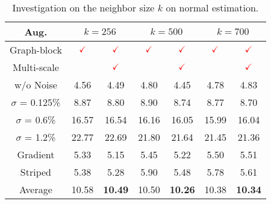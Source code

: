 \documentclass[runningheads]{llncs}
\begin{document}
\begin{table}[!htbp]
\caption{Investigation on the neighbor size $k$ on normal estimation.}
\begin{center}
\begin{tabular}{@{}ccccccc@{}}
\toprule
\textbf{Aug.}        & \multicolumn{2}{c}{$k=256$}                           & \multicolumn{2}{c}{$k=500$}                           & \multicolumn{2}{c}{$k=700$}                           \\ \midrule
Graph-block & $\color{red}\checkmark$ & $\color{red}\checkmark$ & $\color{red}\checkmark$ & $\color{red}\checkmark$ & $\color{red}\checkmark$ & $\color{red}\checkmark$ \\
Multi-scale &                         & $\color{red}\checkmark$ &                         & $\color{red}\checkmark$ &                         & $\color{red}\checkmark$ \\
w/o Noise    & 4.56                    & 4.49                    & 4.80                    & 4.45                    & 4.78                    & 4.83                    \\
$\sigma$ = 0.125\%   & 8.87                    & 8.80                    & 8.90                    & 8.74                   & 8.77                    & 8.70                    \\
$\sigma$ = 0.6\%   & 16.57                   & 16.54                   & 16.16                   & 16.05                   & 15.99                   & 16.04                   \\
$\sigma$ = 1.2\%  & 22.77                   & 22.69                   & 21.80                   & 21.64                   & 21.45                   & 21.36                   \\
Gradient    & 5.33                    & 5.15                    & 5.45                    & 5.22                    & 5.50                    & 5.51                    \\
Striped       & 5.38                    & 5.28                    & 5.90                    & 5.48                    & 5.78                    & 5.61                    \\
Average     & 10.58                   & \textbf{10.49}                   & 10.50                   & \textbf{10.26}                   & 10.38                   & \textbf{10.34}                   \\ \bottomrule
\end{tabular}
\label{tab:scale}
\end{center}
\end{table}
\end{document}
